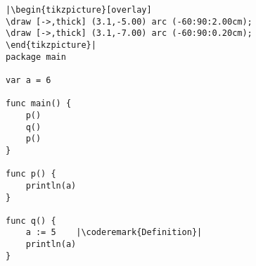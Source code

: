 \begin{lstlisting}[caption=Local scope,label=src:scope1]
|\begin{tikzpicture}[overlay]
\draw [->,thick] (3.1,-5.00) arc (-60:90:2.00cm);
\draw [->,thick] (3.1,-7.00) arc (-60:90:0.20cm);
\end{tikzpicture}|
package main

var a = 6

func main() {
    p()
    q()
    p()
}

func p() {
    println(a)
}

func q() {
    a := 5    |\coderemark{Definition}|
    println(a)
}
\end{lstlisting}
